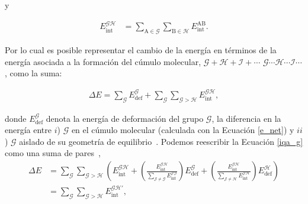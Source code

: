 \noindent y

\begin{align}
E_{\mathrm{int}}^{\mathscr{GH}} &= \displaystyle\sum_{\mathrm{A}\in\mathscr{G}}\displaystyle\sum_{\mathrm{B}\in\mathscr{H}}E_{\mathrm{int}}^{\mathrm{AB}}.
\end{align}

Por lo cual es posible representar el cambio de la energía en términos de la
energía asociada a la formación del cúmulo molecular, $ \mathscr{G} +
\mathscr{H} + \mathscr{I} + \cdots$ \ce{<=>}
$\mathscr{G}\cdots\mathscr{H}\cdots\mathscr{I}\cdots $, como la suma:

\begin{align}
\Delta E = \sum_{\mathscr{G}} E_{\mathrm{def}}^{\mathscr{G}} +
           \sum_{\mathscr{G}} \sum_{\mathscr{G>H}} E_{\mathrm{int}}^{\mathscr{GH}}, 
\label{iqa_g}
\end{align}

\noindent donde $E_{\mathrm{def}}^{\mathscr{G}}$ denota la energía de
deformación del grupo $\mathscr{G}$, la diferencia en la energía entre $i$)
$\mathscr{G}$ en el cúmulo molecular (calculada con la Ecuación \ref{e_net}) y
$ii$) $\mathscr{G}$ aislado de su geometría de equilibrio~\cite{blanco2005}.
Podemos reescribir la Ecuación \ref{iqa_g} como una suma de
pares~\cite{Toche2016},
%
\begin{align}
\Delta E &= \displaystyle\sum_{\mathscr{G}}\displaystyle\sum_{\mathscr{G>H}}\left(E_{\mathrm{int}}^{\mathscr{GH}} + 
           \left(\displaystyle\frac{E_{\mathrm{int}}^{\mathscr{GH}}}{\displaystyle\sum_{\mathscr{J\neq
           G}}E_{\mathrm{int}}^{\mathscr{JG}}}\right)E_{\mathrm{def}}^{\mathscr{G}}
           + \left(\displaystyle\frac{E_{\mathrm{int}}^{\mathscr{GH}}}{\displaystyle\sum_{\mathscr{J\neq
           H}}E_{\mathrm{int}}^{\mathscr{JH}}}\right)E_{\mathrm{def}}^{\mathscr{H}}\right) \nonumber \\
         &=\displaystyle\sum_{\mathscr{G}}\displaystyle\sum_{\mathscr{G>H}}E_{\mathrm{int}}^{\mathscr{GH'}},
  \label{eintprima}
\end{align}

